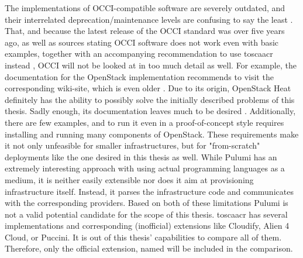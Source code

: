 \newline
The implementations of OCCI-compatible software are severely outdated, and their interrelated deprecation/maintenance levels are confusing to say the least \cite{occi_openstack} \cite{occi_opennebula} \cite{github_tmetsch_occi_os} \cite{github_stackforge_occi_os}.
That, and because the latest release of the OCCI standard was over five years ago, as well as sources stating OCCI software does not work even with basic examples, together with an accompanying recommendation to use \gls{toscaacr} instead \cite{dsl_for_iac}, OCCI will not be looked at in too much detail as well. For example, the documentation for the OpenStack implementation \cite{occi_openstack} recommends to visit the corresponding wiki-site, which is even older \cite{openstack_occi}.
\newline
Due to its origin, OpenStack Heat definitely has the ability to possibly solve the initially described problems of this thesis. Sadly enough, its documentation leaves much to be desired \cite{openstack_heat}. Additionally, there are few examples, and to run it even in a proof-of-concept style requires installing and running many components of OpenStack. These requirements make it not only unfeasible for smaller infrastructures, but for "from-scratch" deployments like the one desired in this thesis as well.
\newline
While Pulumi has an extremely interesting approach with using actual programming languages as a medium, it is neither easily extensible nor does it aim at provisioning infrastructure itself. Instead, it parses the infrastructure code and communicates with the corresponding providers. Based on both of these limitations Pulumi is not a valid potential candidate for the scope of this thesis.
\newline
\Gls{toscaacr} has several implementations and corresponding (inofficial) extensions like Cloudify, Alien 4 Cloud, or Puccini. It is out of this thesis' capabilities to compare all of them. Therefore, only the official extension, named  will be included in the comparison.

